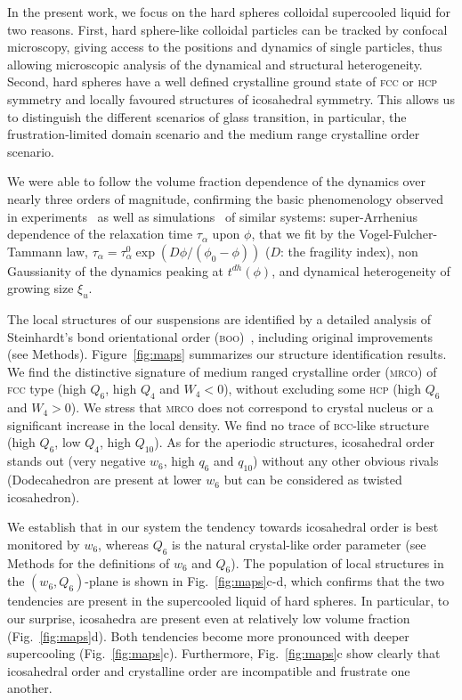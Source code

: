 In the present work, we focus on the hard spheres colloidal supercooled liquid for two reasons. First, hard sphere-like colloidal particles can be tracked by confocal microscopy, giving access to the positions and dynamics of single particles, thus allowing microscopic analysis of the dynamical and structural heterogeneity. Second, hard spheres have a well defined crystalline ground state of \textsc{fcc} or \textsc{hcp} symmetry and locally favoured structures of icosahedral symmetry. This allows us to distinguish the different scenarios of glass transition, in particular, the frustration-limited domain scenario and the medium range crystalline order scenario.



We were able to follow the volume fraction dependence of the dynamics over nearly three orders of magnitude, confirming the basic phenomenology observed in experiments~\citep{pusey1987ogt, kegel2000swe, weeks2000, Berthier2005} as well as simulations~\citep{Kawasaki2010} of similar systems: super-Arrhenius dependence of the relaxation time $\tau_\alpha$ upon $\phi$, that we fit by the Vogel-Fulcher-Tammann law, 
$\tau_\alpha=\tau_\alpha^0 \exp(D\phi/(\phi_0-\phi))$ ($D$: the fragility index), non Gaussianity of the dynamics peaking at $t^{dh}(\phi)$, and dynamical heterogeneity of growing size $\xi_u$.



The local structures of our suspensions are identified by a detailed analysis of Steinhardt's bond orientational order (\textsc{boo})~\citep{steinhardt1983boo}, including original improvements (see Methods). Figure~\ref{fig:maps} summarizes our structure identification results. We find the distinctive signature of medium ranged crystalline order (\textsc{mrco}) of \textsc{fcc} type (high $Q_6$, high $Q_4$ and $W_4<0$), without excluding some \textsc{hcp} (high $Q_6$ and $W_4>0$). We stress that \textsc{mrco} does not correspond to crystal nucleus or a significant increase in the local density. We find no trace of \textsc{bcc}-like structure (high $Q_6$, low $Q_4$, high $Q_{10}$). As for the aperiodic structures, icosahedral order stands out (very negative $w_6$, high $q_6$ and $q_{10}$) without any other obvious rivals (Dodecahedron are present at lower $w_6$ but can be considered as twisted icosahedron).



We establish that in our system the tendency towards icosahedral order is best monitored by $w_6$, whereas $Q_6$ is the natural crystal-like order parameter (see Methods for the definitions of $w_6$ and $Q_6$). The population of local structures in the $(w_6,Q_6)$-plane is shown in Fig.~\ref{fig:maps}c-d, which confirms that the two tendencies are present in the supercooled liquid of hard spheres. In particular, to our surprise, icosahedra are present even at relatively low volume fraction (Fig.~\ref{fig:maps}d). Both tendencies become more pronounced with deeper supercooling (Fig.~\ref{fig:maps}c). Furthermore, Fig.~\ref{fig:maps}c show clearly that icosahedral order and crystalline order are incompatible and frustrate one another.



